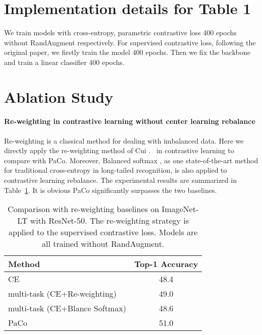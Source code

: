\documentclass[10pt,twocolumn,letterpaper]{article}
\begin{document}
\section{Implementation details for Table 1}
We train models with cross-entropy, parametric contrastive loss 400 epochs without RandAugment respectively. For supervised contrastive loss, following the original paper, we firstly train the model 400 epochs. Then we fix the backbone and train a linear classifier 400 epochs. 

\section{Ablation Study}
\paragraph{Re-weighting in contrastive learning without center learning rebalance}
Re-weighting is a classical method for dealing with imbalanced data. Here we directly apply the re-weighting method of Cui \etal.~\cite{cb-focal} in contrastive learning to compare with PaCo. Moreover, Balanced softmax \cite{DBLP:conf/nips/RenYSMZYL20}, as one state-of-the-art method for traditional cross-entropy in long-tailed recognition, is also applied to contrastive learning rebalance. The experimental results are summarized in Table~\ref{tab:ablation_reweighting_supp}. It is obvious PaCo significantly surpasses the two baselines.
\begin{table}[t]
	\centering
	\caption{Comparison with re-weighting baselines on ImageNet-LT with ResNet-50. The re-weighting strategy is applied to the supervised contrastive loss. Models are all trained without RandAugment. }
	\label{tab:ablation_reweighting_supp}
	\vspace{0pt}
	{
		\begin{tabular}{lc}
			\toprule
			Method  &Top-1 Accuracy \\
			\midrule
			CE                              &48.4 \\
			multi-task (CE+Re-weighting)    &49.0 \\
			multi-task (CE+Blance Softmax)  &48.6 \\
			\midrule
			PaCo                &51.0 \\
			\bottomrule
		\end{tabular}
	}
\end{table}
\end{document}
